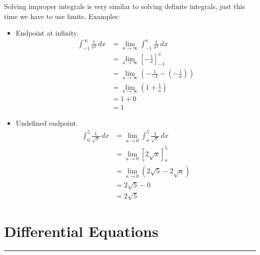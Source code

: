 \documentclass[12pt]{article}
\newcommand{\fline}{\par\noindent\rule{\textwidth}{0.1pt}} %
\begin{document}
Solving improper integrals is very similar to solving definite integrals, just this time we have to use limits. Examples:
\begin{itemize}
    \item Endpoint at infinity.
          \begin{align*}
              \int_{-1}^{\infty} \frac{1}{x^2} \, dx & = \lim_{a \to \infty} \int_{-1}^{a} \frac{1}{x^2} \, dx                          \\[6pt]
                                                     & = \lim_{a \to \infty} \left[ -\frac{1}{x} \right]_{-1}^{a}                       \\[6pt]
                                                     & = \lim_{a \to \infty} \left( -\frac{1}{-1} - \left( -\frac{1}{a} \right) \right) \\[6pt]
                                                     & = \lim_{a \to \infty} \left( 1 + \frac{1}{a} \right)                             \\[6pt]
                                                     & = 1+0                                                                            \\
                                                     & = 1
          \end{align*}

    \item Undefined endpoint.
          \begin{align*}
              \int_{0}^{5} \frac{1}{\sqrt{x}} \, dx & = \lim_{a \to 0} \int_{a}^{5} \frac{1}{\sqrt{x}} \, dx \\[6pt]
                                                    & = \lim_{a \to 0} \left[ 2\sqrt{x} \right]_{a}^{5}      \\
                                                    & = \lim_{a \to 0} \left( 2\sqrt{5} - 2\sqrt{a} \right)  \\
                                                    & = 2\sqrt{5} - 0                                        \\
                                                    & = 2\sqrt{5}
          \end{align*}
\end{itemize}

\section{Differential Equations}
\fline
\end{document}
